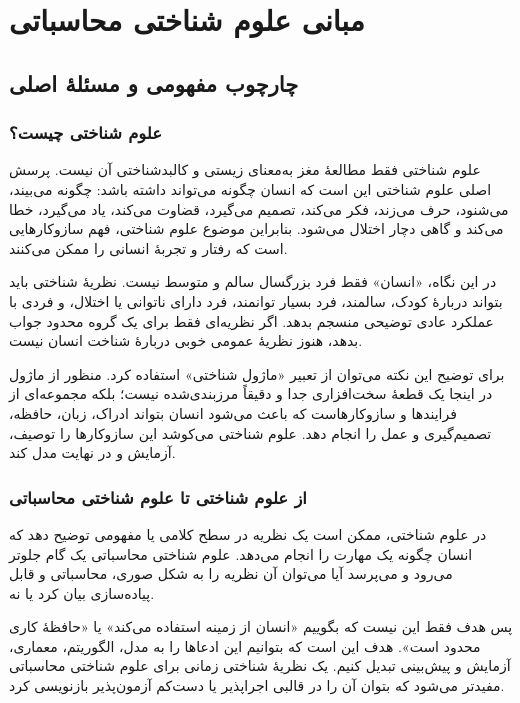 \chapter{مبانی علوم شناختی محاسباتی}

\section{چارچوب مفهومی و مسئلهٔ اصلی}

\subsection{علوم شناختی چیست؟}
علوم شناختی فقط مطالعهٔ مغز به‌معنای زیستی و کالبدشناختی آن نیست. پرسش اصلی علوم شناختی این است که انسان چگونه می‌تواند  داشته باشد: چگونه می‌بیند، می‌شنود، حرف می‌زند، فکر می‌کند، تصمیم می‌گیرد، قضاوت می‌کند، یاد می‌گیرد، خطا می‌کند و گاهی دچار اختلال می‌شود. بنابراین موضوع علوم شناختی، فهم سازوکارهایی است که رفتار و تجربهٔ انسانی را ممکن می‌کنند.

در این نگاه، «انسان» فقط فرد بزرگسال سالم و متوسط نیست. نظریهٔ شناختی باید بتواند دربارهٔ کودک، سالمند، فرد بسیار توانمند، فرد دارای ناتوانی یا اختلال، و فردی با عملکرد عادی توضیحی منسجم بدهد. اگر نظریه‌ای فقط برای یک گروه محدود جواب بدهد، هنوز نظریهٔ عمومی خوبی دربارهٔ شناخت انسان نیست.

برای توضیح این نکته می‌توان از تعبیر «ماژول شناختی» استفاده کرد. منظور از ماژول در اینجا یک قطعهٔ سخت‌افزاری جدا و دقیقاً مرزبندی‌شده نیست؛ بلکه مجموعه‌ای از فرایندها و سازوکارهاست که باعث می‌شود انسان بتواند ادراک، زبان، حافظه، تصمیم‌گیری و عمل را انجام دهد. علوم شناختی می‌کوشد این سازوکارها را توصیف، آزمایش و در نهایت مدل کند.

\subsection{از علوم شناختی تا علوم شناختی محاسباتی}
در علوم شناختی، ممکن است یک نظریه در سطح کلامی یا مفهومی توضیح دهد که انسان چگونه یک مهارت را انجام می‌دهد. علوم شناختی محاسباتی یک گام جلوتر می‌رود و می‌پرسد آیا می‌توان آن نظریه را به شکل صوری، محاسباتی و قابل پیاده‌سازی بیان کرد یا نه.

پس هدف فقط این نیست که بگوییم «انسان از زمینه استفاده می‌کند» یا «حافظهٔ کاری محدود است». هدف این است که بتوانیم این ادعاها را به مدل، الگوریتم، معماری، آزمایش و پیش‌بینی تبدیل کنیم. یک نظریهٔ شناختی زمانی برای علوم شناختی محاسباتی مفیدتر می‌شود که بتوان آن را در قالبی اجراپذیر یا دست‌کم آزمون‌پذیر بازنویسی کرد.

